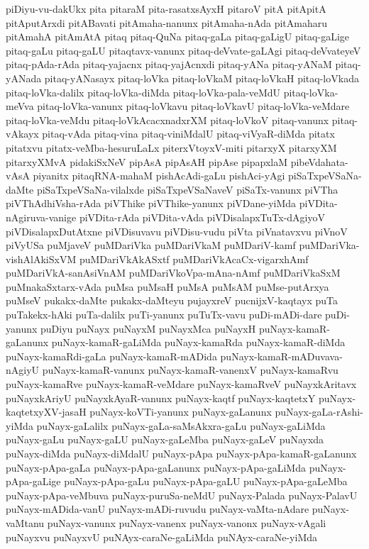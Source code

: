 {piDiyu-vu-dakUkx
pita
pitaraM
pita-rasatxsAyxH
pitaroV
pitA
pitApitA
pitAputArxdi
pitABavati
pitAmaha-nanunx
pitAmaha-nAda
pitAmaharu
pitAmahA
pitAmAtA
pitaq
pitaq-QuNa
pitaq-gaLa
pitaq-gaLigU
pitaq-gaLige
pitaq-gaLu
pitaq-gaLU
pitaqtavx-vanunx
pitaq-deVvate-gaLAgi
pitaq-deVvateyeV
pitaq-pAda-rAda
pitaq-yajacnx
pitaq-yajAcnxdi
pitaq-yANa
pitaq-yANaM
pitaq-yANada
pitaq-yANasayx
pitaq-loVka
pitaq-loVkaM
pitaq-loVkaH
pitaq-loVkada
pitaq-loVka-dalilx
pitaq-loVka-diMda
pitaq-loVka-pala-veMdU
pitaq-loVka-meVva
pitaq-loVka-vanunx
pitaq-loVkavu
pitaq-loVkavU
pitaq-loVka-veMdare
pitaq-loVka-veMdu
pitaq-loVkAcacxnadxrXM
pitaq-loVkoV
pitaq-vanunx
pitaq-vAkayx
pitaq-vAda
pitaq-vina
pitaq-viniMdalU
pitaq-viVyaR-diMda
pitatx
pitatxvu
pitatx-veMba-hesuruLaLx
piterxVtoyxV-miti
pitarxyX
pitarxyXM
pitarxyXMvA
pidakiSxNeV
pipAsA
pipAsAH
pipAse
pipapxlaM
pibeVdahata-vAsA
piyanitx
pitaqRNA-mahaM
pishAcAdi-gaLu
pishAci-yAgi
piSaTxpeVSaNa-daMte
piSaTxpeVSaNa-vilalxde
piSaTxpeVSaNaveV
piSaTx-vanunx
piVTha
piVThAdhiVsha-rAda
piVThike
piVThike-yanunx
piVDane-yiMda
piVDita-nAgiruva-vanige
piVDita-rAda
piVDita-vAda
piVDisalapxTuTx-dAgiyoV
piVDisalapxDutAtxne
piVDisuvavu
piVDisu-vudu
piVta
piVnatavxvu
piVnoV
piVyUSa
puMjaveV
puMDariVka
puMDariVkaM
puMDariV-kamf
puMDariVka-vishAlAkiSxVM
puMDariVkAkASxtf
puMDariVkAcaCx-vigarxhAmf
puMDariVkA-sanAsiVnAM
puMDariVkoVpa-mAna-nAmf
puMDariVkaSxM
puMnakaSxtarx-vAda
puMsa
puMsaH
puMsA
puMsAM
puMse-putArxya
puMseV
pukakx-daMte
pukakx-daMteyu
pujayxreV
pucnijxV-kaqtayx
puTa
puTakekx-hAki
puTa-dalilx
puTi-yanunx
puTuTx-vavu
puDi-mADi-dare
puDi-yanunx
puDiyu
puNayx
puNayxM
puNayxMca
puNayxH
puNayx-kamaR-gaLanunx
puNayx-kamaR-gaLiMda
puNayx-kamaRda
puNayx-kamaR-diMda
puNayx-kamaRdi-gaLa
puNayx-kamaR-mADida
puNayx-kamaR-mADuvava-nAgiyU
puNayx-kamaR-vanunx
puNayx-kamaR-vanenxV
puNayx-kamaRvu
puNayx-kamaRve
puNayx-kamaR-veMdare
puNayx-kamaRveV
puNayxkAritavx
puNayxkAriyU
puNayxkAyaR-vanunx
puNayx-kaqtf
puNayx-kaqtetxY
puNayx-kaqtetxyXV-jasaH
puNayx-koVTi-yanunx
puNayx-gaLanunx
puNayx-gaLa-rAshi-yiMda
puNayx-gaLalilx
puNayx-gaLa-saMsAkxra-gaLu
puNayx-gaLiMda
puNayx-gaLu
puNayx-gaLU
puNayx-gaLeMba
puNayx-gaLeV
puNayxda
puNayx-diMda
puNayx-diMdalU
puNayx-pApa
puNayx-pApa-kamaR-gaLanunx
puNayx-pApa-gaLa
puNayx-pApa-gaLanunx
puNayx-pApa-gaLiMda
puNayx-pApa-gaLige
puNayx-pApa-gaLu
puNayx-pApa-gaLU
puNayx-pApa-gaLeMba
puNayx-pApa-veMbuva
puNayx-puruSa-neMdU
puNayx-Palada
puNayx-PalavU
puNayx-mADida-vanU
puNayx-mADi-ruvudu
puNayx-vaMta-nAdare
puNayx-vaMtanu
puNayx-vanunx
puNayx-vanenx
puNayx-vanonx
puNayx-vAgali
puNayxvu
puNayxvU
puNAyx-caraNe-gaLiMda
puNAyx-caraNe-yiMda
}
